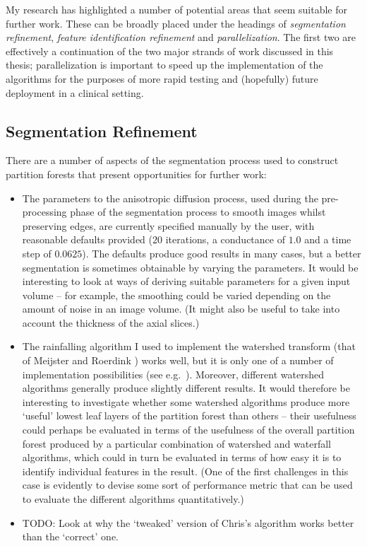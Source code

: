 \fi

My research has highlighted a number of potential areas that seem suitable for further work. These can be broadly placed under the headings of \emph{segmentation refinement}, \emph{feature identification refinement} and \emph{parallelization}. The first two are effectively a continuation of the two major strands of work discussed in this thesis; parallelization is important to speed up the implementation of the algorithms for the purposes of more rapid testing and (hopefully) future deployment in a clinical setting.

\subsection{Segmentation Refinement}

There are a number of aspects of the segmentation process used to construct partition forests that present opportunities for further work:
%
\begin{itemize}

\item The parameters to the anisotropic diffusion process, used during the pre-processing phase of the segmentation process to smooth images whilst preserving edges, are currently specified manually by the user, with reasonable defaults provided ($20$ iterations, a conductance of $1.0$ and a time step of $0.0625$). The defaults produce good results in many cases, but a better segmentation is sometimes obtainable by varying the parameters. It would be interesting to look at ways of deriving suitable parameters for a given input volume -- for example, the smoothing could be varied depending on the amount of noise in an image volume. (It might also be useful to take into account the thickness of the axial slices.)

\item The rainfalling algorithm I used to implement the watershed transform (that of Meijster and Roerdink \cite{meijster98}) works well, but it is only one of a number of implementation possibilities (see e.g.~\cite{roerdink01}). Moreover, different watershed algorithms generally produce slightly different results. It would therefore be interesting to investigate whether some watershed algorithms produce more `useful' lowest leaf layers of the partition forest than others -- their usefulness could perhaps be evaluated in terms of the usefulness of the overall partition forest produced by a particular combination of watershed and waterfall algorithms, which could in turn be evaluated in terms of how easy it is to identify individual features in the result. (One of the first challenges in this case is evidently to devise some sort of performance metric that can be used to evaluate the different algorithms quantitatively.)

\item TODO: Look at why the `tweaked' version of Chris's algorithm works better than the `correct' one.

\end{itemize}

